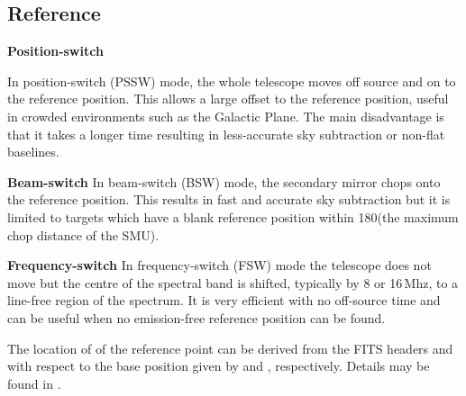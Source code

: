 \documentclass[11pt,oneside,chapters]{starlink}
\begin{document}
\subsection{Reference}
\label{sec:reference_mode}

\begin{aligndesc}
\item[\textbf{Position-switch}]

In position-switch (PSSW) mode, the whole telescope moves off source
and on to the reference position. This allows a large offset to the
reference position, useful in crowded environments such as the Galactic
Plane. The main disadvantage is that it takes a longer time resulting
in less-accurate sky subtraction or non-flat baselines.

\item[\textbf{Beam-switch}]
In beam-switch (BSW) mode, the secondary mirror chops onto the reference
position. This results in fast and accurate sky subtraction but it is
limited to targets which have a blank reference position within
180\arcsec (the maximum chop distance of the SMU).

\item[\textbf{Frequency-switch}]
In frequency-switch (FSW) mode the telescope does not move but the
centre of the spectral band is shifted, typically by 8 or 16\,Mhz,
to a line-free region of the spectrum. It is very efficient with no
off-source time and can be
useful when no emission-free reference position can be found.
\end{aligndesc}

\begin{tip}
The location of of the reference point can be derived from the FITS headers
 and  with respect to the base position
given by  and , respectively.  Details
may be found in .
\end{tip}
\end{document}
